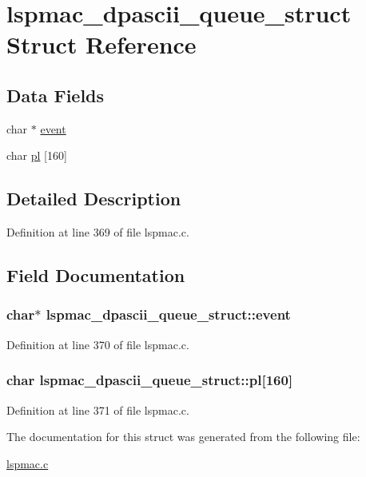 \hypertarget{structlspmac__dpascii__queue__struct}{\section{lspmac\-\_\-dpascii\-\_\-queue\-\_\-struct Struct Reference}
\label{structlspmac__dpascii__queue__struct}
}
\subsection*{Data Fields}
\begin{DoxyCompactItemize}
\item 
char $\ast$ \hyperlink{structlspmac__dpascii__queue__struct_a8775c09713a917f4ddd80a3a5a8a4668}{event}
\item 
char \hyperlink{structlspmac__dpascii__queue__struct_a318d65317b14eba9e38efd0ab0133a5c}{pl} \mbox{[}160\mbox{]}
\end{DoxyCompactItemize}


\subsection{Detailed Description}


Definition at line 369 of file lspmac.\-c.



\subsection{Field Documentation}
\hypertarget{structlspmac__dpascii__queue__struct_a8775c09713a917f4ddd80a3a5a8a4668}{
\subsubsection[{event}]{\setlength{\rightskip}{0pt plus 5cm}char$\ast$ lspmac\-\_\-dpascii\-\_\-queue\-\_\-struct\-::event}}\label{structlspmac__dpascii__queue__struct_a8775c09713a917f4ddd80a3a5a8a4668}


Definition at line 370 of file lspmac.\-c.

\hypertarget{structlspmac__dpascii__queue__struct_a318d65317b14eba9e38efd0ab0133a5c}{
\subsubsection[{pl}]{\setlength{\rightskip}{0pt plus 5cm}char lspmac\-\_\-dpascii\-\_\-queue\-\_\-struct\-::pl\mbox{[}160\mbox{]}}}\label{structlspmac__dpascii__queue__struct_a318d65317b14eba9e38efd0ab0133a5c}


Definition at line 371 of file lspmac.\-c.



The documentation for this struct was generated from the following file\-:\begin{DoxyCompactItemize}
\item 
\hyperlink{lspmac_8c}{lspmac.\-c}\end{DoxyCompactItemize}
